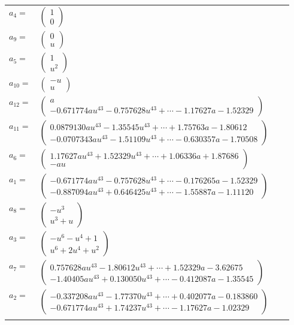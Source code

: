 \documentclass[1p]{elsarticle_modified}
\theoremstyle{definition}
\begin{document}
\begin{tabular}{m{7pt} m{180pt} m{7pt} m{180pt} }
\flushright $a_{4}=$&$\begin{pmatrix}1\\0\end{pmatrix}$ \\
\flushright $a_{9}=$&$\begin{pmatrix}0\\u\end{pmatrix}$ \\
\flushright $a_{5}=$&$\begin{pmatrix}1\\u^2\end{pmatrix}$ \\
\flushright $a_{10}=$&$\begin{pmatrix}- u\\u\end{pmatrix}$ \\
\flushright $a_{12}=$&$\begin{pmatrix}a\\-0.671774 a u^{43}-0.757628 u^{43}+\cdots-1.17627 a-1.52329\end{pmatrix}$ \\
\flushright $a_{11}=$&$\begin{pmatrix}0.0879130 a u^{43}-1.35545 u^{43}+\cdots+1.75763 a-1.80612\\-0.0707343 a u^{43}-1.51109 u^{43}+\cdots-0.630357 a-1.70508\end{pmatrix}$ \\
\flushright $a_{6}=$&$\begin{pmatrix}1.17627 a u^{43}+1.52329 u^{43}+\cdots+1.06336 a+1.87686\\- a u\end{pmatrix}$ \\
\flushright $a_{1}=$&$\begin{pmatrix}-0.671774 a u^{43}-0.757628 u^{43}+\cdots-0.176265 a-1.52329\\-0.887094 a u^{43}+0.646425 u^{43}+\cdots-1.55887 a-1.11120\end{pmatrix}$ \\
\flushright $a_{8}=$&$\begin{pmatrix}- u^3\\u^3+u\end{pmatrix}$ \\
\flushright $a_{3}=$&$\begin{pmatrix}- u^6- u^4+1\\u^6+2 u^4+u^2\end{pmatrix}$ \\
\flushright $a_{7}=$&$\begin{pmatrix}0.757628 a u^{43}-1.80612 u^{43}+\cdots+1.52329 a-3.62675\\-1.40405 a u^{43}+0.130050 u^{43}+\cdots-0.412087 a-1.35545\end{pmatrix}$ \\
\flushright $a_{2}=$&$\begin{pmatrix}-0.337208 a u^{43}-1.77370 u^{43}+\cdots+0.402077 a-0.183860\\-0.671774 a u^{43}+1.74237 u^{43}+\cdots-1.17627 a-1.02329\end{pmatrix}$\\&\end{tabular}
\end{document}
